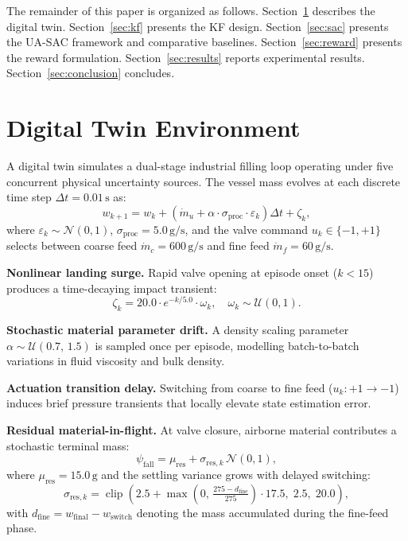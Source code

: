 \documentclass[conference]{IEEEtran}
\begin{document}
The remainder of this paper is organized as follows. 
Section~\ref{sec:env} describes the digital twin. 
Section~\ref{sec:kf} presents the KF design. 
Section~\ref{sec:sac} presents the UA-SAC framework and comparative baselines.
Section~\ref{sec:reward} presents the reward formulation. 
Section~\ref{sec:results} reports experimental results. 
Section~\ref{sec:conclusion} concludes.
\section{Digital Twin Environment}
\label{sec:env}

A digital twin simulates a dual-stage industrial filling loop 
operating under five concurrent physical uncertainty sources. 
The vessel mass evolves at each discrete time step 
$\Delta t = 0.01\,\text{s}$ as:
\begin{equation}
    w_{k+1} = w_k + \left(\dot{m}_u + \alpha \cdot 
    \sigma_\text{proc} \cdot \varepsilon_k\right)\Delta t + \zeta_k,
\end{equation}
where $\varepsilon_k \sim \mathcal{N}(0,1)$, 
$\sigma_\text{proc} = 5.0\,\text{g/s}$, and the valve 
command $u_k \in \{-1,+1\}$ selects between coarse feed 
$\dot{m}_c = 600\,\text{g/s}$ and fine feed 
$\dot{m}_f = 60\,\text{g/s}$.

\textbf{Nonlinear landing surge.} Rapid valve opening at 
episode onset ($k < 15$) produces a time-decaying impact 
transient:
\begin{equation}
    \zeta_k = 20.0 \cdot e^{-k/5.0} \cdot \omega_k, 
    \quad \omega_k \sim \mathcal{U}(0,1).
\end{equation}

\textbf{Stochastic material parameter drift.} A density 
scaling parameter $\alpha \sim \mathcal{U}(0.7,\,1.5)$ is 
sampled once per episode, modelling batch-to-batch 
variations in fluid viscosity and bulk density.

\textbf{Actuation transition delay.} Switching from coarse 
to fine feed ($u_k: +1 \to -1$) induces brief pressure 
transients that locally elevate state estimation error.

\textbf{Residual material-in-flight.} At valve closure, 
airborne material contributes a stochastic terminal mass:
\begin{equation}
    \psi_\text{fall} = \mu_\text{res} + 
    \sigma_{\text{res},k}\,\mathcal{N}(0,1),
\end{equation}
where $\mu_\text{res} = 15.0\,\text{g}$ and the settling 
variance grows with delayed switching:
\begin{equation}
    \sigma_{\text{res},k} = \operatorname{clip}\!\left(
    2.5 + \max\!\left(0,\,
    \tfrac{275 - d_\text{fine}}{275}\right)\cdot 17.5,\;
    2.5,\;20.0\right),
\end{equation}
with $d_\text{fine} = w_\text{final} - w_\text{switch}$ 
denoting the mass accumulated during the fine-feed phase.
\end{document}
